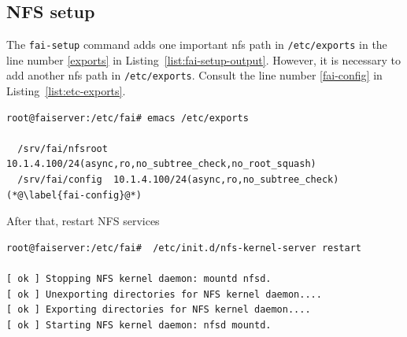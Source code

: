 \documentclass[11pt
  , a4paper
  , article
  , oneside
]{memoir}
\begin{document}
\subsection{NFS setup}
The \texttt{fai-setup} command adds one important nfs path in \texttt{/etc/exports} in the line number \ref{exports} in Listing~\ref{list:fai-setup-output}. However, it is necessary to add another nfs path in \texttt{/etc/exports}. Consult the line number \ref{fai-config} in Listing~\ref{list:etc-exports}.
\begin{lstlisting}[style=termstylenumber, caption={Add \texttt{/srv/fai/config} directory to \texttt{/etc/exports}}, label={list:etc-exports}]
root@faiserver:/etc/fai# emacs /etc/exports

  /srv/fai/nfsroot 10.1.4.100/24(async,ro,no_subtree_check,no_root_squash)
  /srv/fai/config  10.1.4.100/24(async,ro,no_subtree_check) (*@\label{fai-config}@*) 
\end{lstlisting}
After that, restart NFS services 

\begin{lstlisting}
root@faiserver:/etc/fai#  /etc/init.d/nfs-kernel-server restart

[ ok ] Stopping NFS kernel daemon: mountd nfsd.
[ ok ] Unexporting directories for NFS kernel daemon....
[ ok ] Exporting directories for NFS kernel daemon....
[ ok ] Starting NFS kernel daemon: nfsd mountd.
\end{lstlisting}
\end{document}
